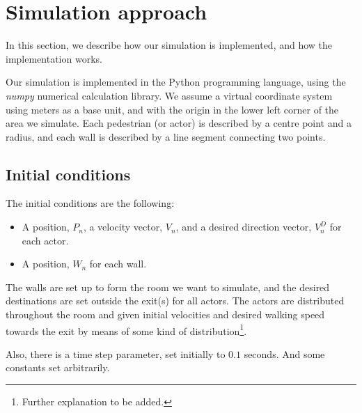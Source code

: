 \section{Simulation approach}
In this section, we describe how our simulation is implemented, and how the 
implementation works.

Our simulation is implemented in the Python programming language, using the 
\emph{numpy} numerical calculation library. We assume a virtual coordinate 
system using meters as a base unit, and with the origin in the lower left 
corner of the area we simulate. Each pedestrian (or actor) is described by a 
centre point and a radius, and each wall is described by a line segment 
connecting two points.

\subsection{Initial conditions}
The initial conditions are the following:

\begin{itemize}
    \item A position, $P_n$, a velocity vector, $V_n$, and a desired direction 
        vector, $V^D_{n}$ for each actor.
    \item A position, $W_n$ for each wall.
\end{itemize}

The walls are set up to form the room we want to simulate, and the desired 
destinations are set outside the exit(s) for all actors. The actors are 
distributed throughout the room and given initial velocities and desired 
walking speed towards the exit by means of some kind of 
distribution\footnote{Further explanation to be added.}.

Also, there is a time step parameter, set initially to $0.1$ seconds. And some 
constants set arbitrarily.

